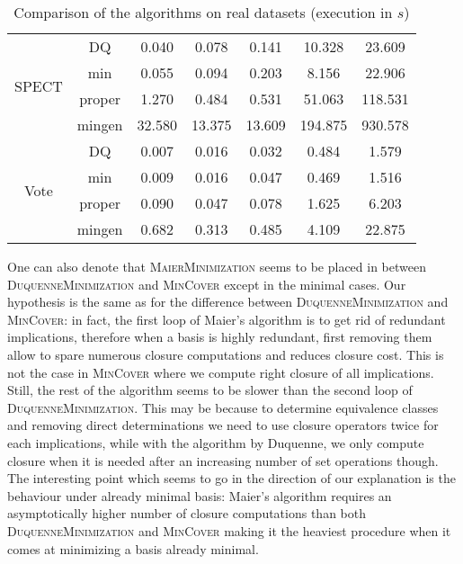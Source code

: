 \begin{table}[ht]
\begin{tabular}{| c | c || c | c | c | c | c |}
	\multirow{4}{*}{SPECT} & DQ & 0.040 & 0.078 & 0.141 & 10.328 & 23.609 \\
	& min & 0.055 & 0.094 & 0.203 & 8.156 & 22.906 \\
	& proper & 1.270 & 0.484 & 0.531 & 51.063 & 118.531 \\
	& mingen & 32.580 & 13.375 & 13.609 & 194.875 & 930.578 \\ \hline
	
	\multirow{4}{*}{Vote} & DQ & 0.007 & 0.016 & 0.032 & 0.484 & 1.579 \\ 
	& min & 0.009 & 0.016 & 0.047 & 0.469 & 1.516 \\
	& proper & 0.090 & 0.047 & 0.078 & 1.625 & 6.203 \\
	& mingen & 0.682 & 0.313 & 0.485 & 4.109 & 22.875 \\ \hline
	
	
\end{tabular} 
\caption{Comparison of the algorithms on real datasets (execution in $s$)}
\label{tab:real-exe}
\end{table}

\vspace{1.2em}

One can also denote that \textsc{MaierMinimization} seems to be placed in between \textsc{DuquenneMinimization} and \textsc{MinCover} except in the minimal cases. Our hypothesis is the same as for the difference between 
\textsc{DuquenneMinimization} and \textsc{MinCover}: in fact, the first loop of Maier's algorithm is to get rid of redundant implications, therefore when a 
basis is highly redundant, first removing them allow to spare numerous closure
computations and reduces closure cost. This is not the case in \textsc{MinCover}
where we compute right closure of all implications. Still, the rest of the algorithm seems to be slower than the second loop of \textsc{DuquenneMinimization}. This may be because to determine equivalence classes and removing direct determinations we need to use closure operators
twice for each implications, while with the algorithm by Duquenne, we only compute closure when it is needed after an increasing number of set operations though. The interesting point which seems to go in the direction of our explanation is the behaviour under already minimal basis: Maier's algorithm requires an asymptotically higher number of closure computations than both 
\textsc{DuquenneMinimization} and \textsc{MinCover} making it the heaviest 
procedure when it comes at minimizing a basis already minimal.

